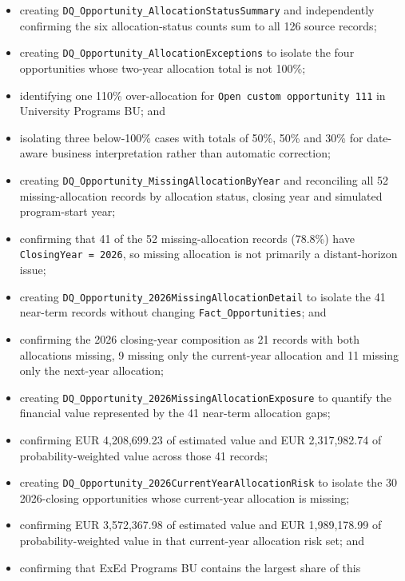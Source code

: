 \documentclass[11pt,a4paper]{article}
\begin{document}
\begin{itemize}[leftmargin=7mm,itemsep=3pt]
    below 100\%, and 1 record above 100\% for targeted business review;
    \item creating \texttt{DQ\_Opportunity\_AllocationStatusSummary} and independently
    confirming the six allocation-status counts sum to all 126 source records;
    \item creating \texttt{DQ\_Opportunity\_AllocationExceptions} to isolate the four
    opportunities whose two-year allocation total is not 100\%;
    \item identifying one 110\% over-allocation for \texttt{Open custom opportunity 111}
    in University Programs BU; and
    \item isolating three below-100\% cases with totals of 50\%, 50\% and 30\% for
    date-aware business interpretation rather than automatic correction;
    \item creating \texttt{DQ\_Opportunity\_MissingAllocationByYear} and reconciling
    all 52 missing-allocation records by allocation status, closing year and
    simulated program-start year;
    \item confirming that 41 of the 52 missing-allocation records (78.8\%) have
    \texttt{ClosingYear = 2026}, so missing allocation is not primarily a distant-horizon issue;
    \item creating \texttt{DQ\_Opportunity\_2026MissingAllocationDetail} to isolate
    the 41 near-term records without changing \texttt{Fact\_Opportunities}; and
    \item confirming the 2026 closing-year composition as 21 records with both
    allocations missing, 9 missing only the current-year allocation and
    11 missing only the next-year allocation;
    \item creating \texttt{DQ\_Opportunity\_2026MissingAllocationExposure} to quantify
    the financial value represented by the 41 near-term allocation gaps;
    \item confirming EUR 4,208,699.23 of estimated value and EUR 2,317,982.74 of
    probability-weighted value across those 41 records;
    \item creating \texttt{DQ\_Opportunity\_2026CurrentYearAllocationRisk} to isolate
    the 30 2026-closing opportunities whose current-year allocation is missing;
    \item confirming EUR 3,572,367.98 of estimated value and EUR 1,989,178.99 of
    probability-weighted value in that current-year allocation risk set; and
    \item confirming that ExEd Programs BU contains the largest share of this

\end{itemize}
\end{document}
